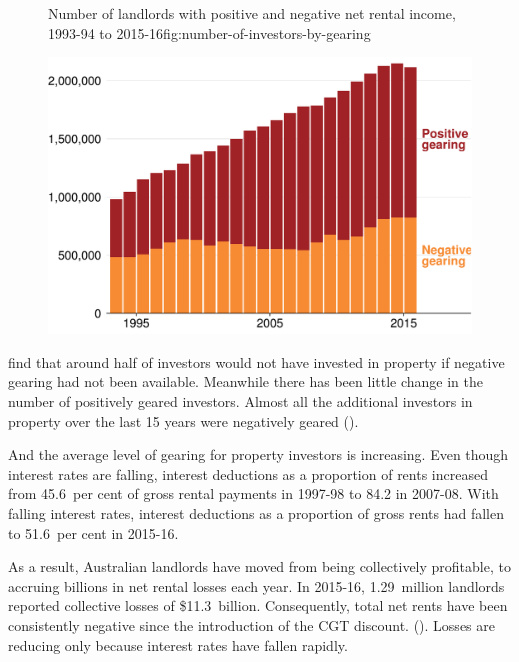 \documentclass{grattan}\usepackage[]{graphicx}\usepackage[]{color}
\begin{document}
\begin{figure}
%
{Number of landlords with positive and negative net rental income, 1993-94 to 2015-16}{fig:number-of-investors-by-gearing}

\includegraphics[width=\columnwidth]{CGT-NG-atlas//number-of-investors-by-gearing-1}
\end{figure}

\textcite{SeeligThompsonBurkeEtAl2009} find that around half of investors would not have invested in property if negative gearing had not been available.  Meanwhile there has been little change in the number of positively geared investors. Almost all the additional investors in property over the last 15 years were negatively geared ().


 
 And the average level of gearing for property investors is increasing.
 Even though interest rates are falling, interest deductions as a proportion of rents increased from 45.6~per cent of gross rental payments in \mbox{1997-98} to 84.2 in 2007-08. With falling interest rates, interest deductions as a proportion of gross rents had fallen to 51.6~per cent in 2015-16.
 


As a result, Australian landlords have moved from being collectively profitable, to accruing billions in net rental losses each year. In 2015-16, 1.29~million landlords reported collective losses of \$11.3~billion. Consequently, total net rents have been consistently negative since the introduction of the CGT discount. ().  Losses are reducing only because interest rates have fallen rapidly.
\end{document}
